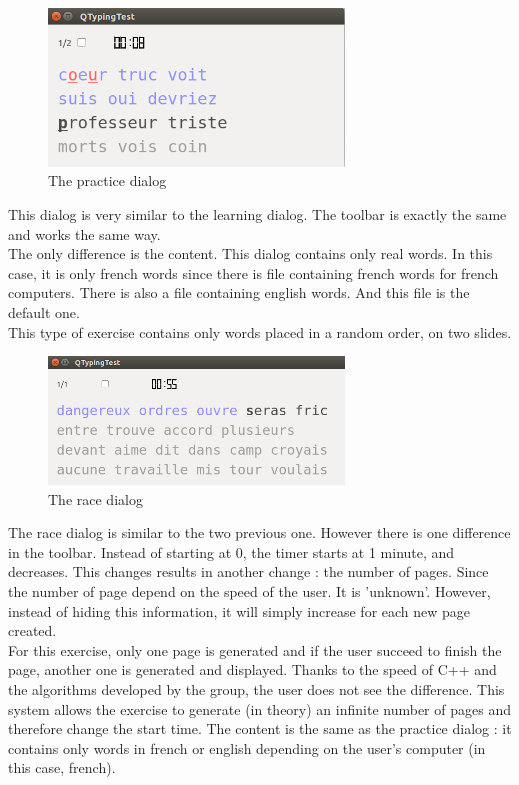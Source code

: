 \begin{figure}[H]
	\centering
	\includegraphics[width=0.7\textwidth]{images/dialog-practice.png}
	 \caption{The practice dialog}
	 \label{dialog-practice}
\end{figure}

This dialog is very similar to the learning dialog. The toolbar is exactly the same and works the same way.\\
The only difference is the content. This dialog contains only real words. In this case, it is only french words since there is file containing french words for french computers. There is also a file containing english words. And this file is the default one.\\
This type of exercise contains only words placed in a random order, on two slides.

\begin{figure}[H]
	\centering
	\includegraphics[width=0.7\textwidth]{images/dialog-race.png}
	 \caption{The race dialog}
	 \label{dialog-race}
\end{figure}

The race dialog is similar to the two previous one. However there is one difference in the toolbar. Instead of starting at 0, the timer starts at 1 minute, and decreases. This changes results in another change : the number of pages. Since the number of page depend on the speed of the user. It is 'unknown'. However, instead of hiding this information, it will simply increase for each new page created.\\
For this exercise, only one page is generated and if the user succeed to finish the page, another one is generated and displayed. Thanks to the speed of C++ and the algorithms developed by the group, the user does not see the difference. This system allows the exercise to generate (in theory) an infinite number of pages and therefore change the start time.
The content is the same as the practice dialog : it contains only words in french or english depending on the user's computer (in this case, french).\\

